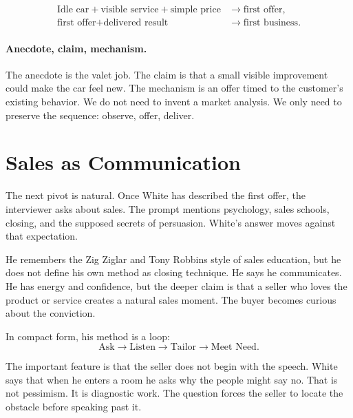 \begin{align}
\text{Idle car}+\text{visible service}+\text{simple price}
&\longrightarrow \text{first offer},\\
\text{first offer}+\text{delivered result}
&\longrightarrow \text{first business}.
\end{align}

\paragraph{Anecdote, claim, mechanism.}
The anecdote is the valet job. The claim is that a small visible improvement could make the car feel new. The mechanism is an offer timed to the customer's existing behavior. We do not need to invent a market analysis. We only need to preserve the sequence: observe, offer, deliver.

\section{Sales as Communication}

The next pivot is natural. Once White has described the first offer, the interviewer asks about sales. The prompt mentions psychology, sales schools, closing, and the supposed secrets of persuasion. White's answer moves against that expectation.

He remembers the Zig Ziglar and Tony Robbins style of sales education, but he does not define his own method as closing technique. He says he communicates. He has energy and confidence, but the deeper claim is that a seller who loves the product or service creates a natural sales moment. The buyer becomes curious about the conviction.

In compact form, his method is a loop:
\begin{equation}
\text{Ask}\longrightarrow \text{Listen}\longrightarrow
\text{Tailor}\longrightarrow \text{Meet Need}.
\end{equation}

The important feature is that the seller does not begin with the speech. White says that when he enters a room he asks why the people might say no. That is not pessimism. It is diagnostic work. The question forces the seller to locate the obstacle before speaking past it.

